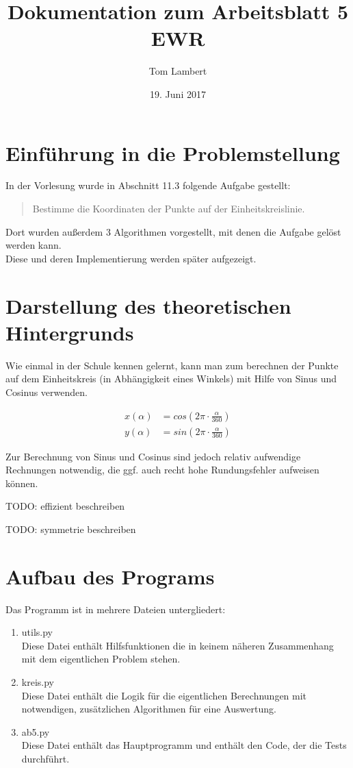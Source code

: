 \documentclass{scrartcl}
\title{Dokumentation zum Arbeitsblatt 5 EWR}
\author{Tom Lambert}
\date{19. Juni 2017}
\begin{document}
	
	\maketitle
	\tableofcontents
	
	\section{Einführung in die Problemstellung}
	
	In der Vorlesung wurde in Abschnitt 11.3 folgende Aufgabe gestellt:
	
	\begin{quote}
		Bestimme die Koordinaten der Punkte auf der Einheitskreislinie.
	\end{quote}
	
	Dort wurden außerdem 3 Algorithmen vorgestellt, mit denen die Aufgabe gelöst werden kann. \\
	Diese und deren Implementierung werden später aufgezeigt.
	
	
	
	\section{Darstellung des theoretischen Hintergrunds}
	
	Wie einmal in der Schule kennen gelernt, kann man zum berechnen der Punkte auf dem Einheitskreis (in Abhängigkeit eines Winkels) mit Hilfe von Sinus und Cosinus verwenden.
	
	\begin{align}
		x(\alpha) &= cos(2\pi\cdot \frac{\alpha}{360}) \\
		y(\alpha) &= sin(2\pi\cdot \frac{\alpha}{360})
	\end{align}
	
	Zur Berechnung von Sinus und Cosinus sind jedoch relativ aufwendige Rechnungen notwendig, die ggf. auch recht hohe Rundungsfehler aufweisen können.
	
	TODO: effizient beschreiben
	
	TODO: symmetrie beschreiben
	
	
	
	\section{Aufbau des Programs}
	
	Das Programm ist in mehrere Dateien untergliedert:
	
	\begin{enumerate}
		\item utils.py \\ Diese Datei enthält Hilfsfunktionen die in keinem näheren Zusammenhang mit dem eigentlichen Problem stehen. 
		\item kreis.py \\ Diese Datei enthält die Logik für die eigentlichen Berechnungen mit notwendigen, zusätzlichen Algorithmen für eine Auswertung.
		\item ab5.py \\ Diese Datei enthält das Hauptprogramm und enthält den Code, der die Tests durchführt.
	\end{enumerate}
	
\end{document}
